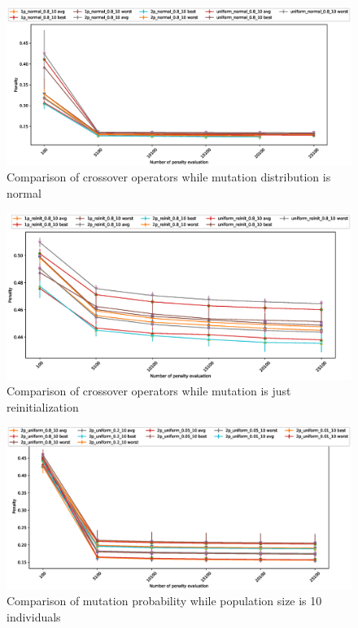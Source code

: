 \documentclass{article}
\begin{document}
\begin{figure}
    \centering
    \includegraphics[width=5.0in]{crossover_comparison_md_normal}
    \caption{Comparison of crossover operators while mutation distribution is normal}
    \label{crossovercomp2}
\end{figure}

\begin{figure}
    \centering
    \includegraphics[width=5.0in]{crossover_comparison_md_reinit}
    \caption{Comparison of crossover operators while mutation is just reinitialization}
    \label{crossovercomp3}
\end{figure}

\begin{figure}
    \centering
    \includegraphics[width=5.0in]{mutation_probability_comparison_population_10}
    \caption{Comparison of mutation probability while population size is 10 individuals}
    \label{mutationprobcomp1}
\end{figure}
\end{document}
